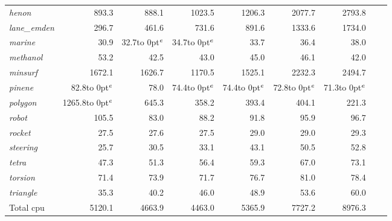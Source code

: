 \documentclass[draft,leqno,onefignum,onetabnum]{siamltex}
\def\strut{\rule[-1.25ex]{0pt}{4ex}}%
\def\strutl{\rule[-1.25ex]{0pt}{3ex}}%
\def\acc {\hbox to 0pt{$\null^e$\hss}}
\def\Cute#1{\hbox{\it\lowercase{#1}\/}}
\begin{document}
\begin{table}[p]
\begin{center}
\begin{tabular}{|l|r|r|r|r|r|r|r|r|}
\\        \Cute{henon}      & 893.3    & 888.1    &1023.5    &1206.3    &2077.7     &2793.8
\\        \Cute{lane\_emden}& 296.7    & 461.6    & 731.6    & 891.6    &1333.6     &1734.0
\\        \Cute{marine}     &  30.9    &  32.7\acc&  34.7\acc&  33.7    &  36.4     &  38.0
\\        \Cute{methanol}   &  53.2    &  42.5    &  43.0    &  45.0    &  46.1     &  42.0
\\        \Cute{minsurf}    &1672.1    &1626.7    &1170.5    &1525.1    &2232.3     &2494.7
\\        \Cute{pinene}     &  82.8\acc&  78.0    &  74.4\acc&  74.4\acc&  72.8\acc &  71.3\acc
\\        \Cute{polygon}    &1265.8\acc& 645.3    & 358.2    & 393.4    & 404.1     & 221.3
\\        \Cute{robot}      & 105.5    &  83.0    &  88.2    &  91.8    &  95.9     &  96.7
\\        \Cute{rocket}     &  27.5    &  27.6    &  27.5    &  29.0    &  29.0     &  29.3
\\        \Cute{steering}   &  25.7    &  30.5    &  33.1    &  43.1    &  50.5     &  52.8
\\        \Cute{tetra}      &  47.3    &  51.3    &  56.4    &  59.3    &  67.0     &  73.1
\\        \Cute{torsion}    &  71.4    &  73.9    &  71.7    &  76.7    &  81.0     &  78.4
\\\strutl \Cute{triangle}   &  35.3    &  40.2    &  46.0    &  48.9    &  53.6     &  60.0
\\\hline\strut Total  cpu   &5120.1    &4663.9    &4463.0    &5365.9    &7727.2     &8976.3
\\\hline
\end{tabular}
\end{center}
\end{table}
\end{document}
